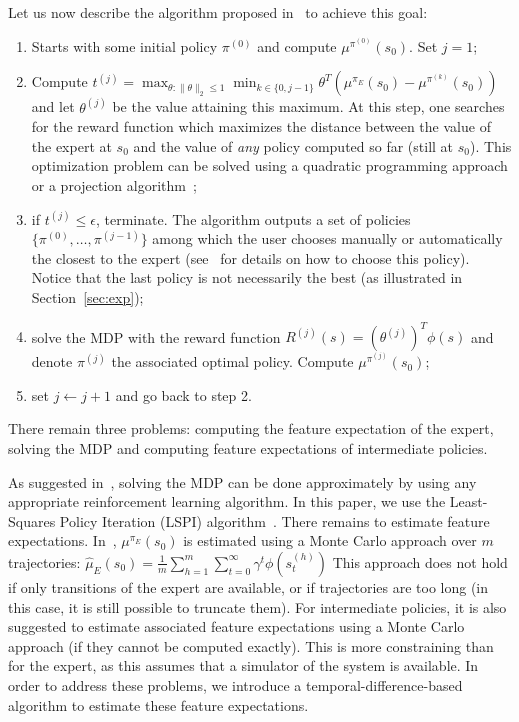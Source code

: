 \documentclass{llncs}
\begin{document}
Let us now describe the algorithm proposed in~\citep{abbeel2004apprenticeship} to
achieve this goal:
\begin{enumerate}
  \item Starts with some initial policy $\pi^{(0)}$ and compute
  $\mu^{\pi^{(0)}}(s_0)$. Set $j=1$;
  \item Compute $t^{(j)} = \max_{\theta: \|\theta\|_2\leq 1}
  \min_{k\in\{0,j-1\}}\theta^T(\mu^{\pi_E}(s_0) -
  \mu^{\pi^{(k)}}(s_0))$ and let $\theta^{(j)}$ be the value
  attaining this maximum. At this step, one searches for the reward
  function which maximizes the distance between the value of the
  expert at $s_0$ and the value of \emph{any} policy computed so far
  (still at $s_0$). This optimization problem can be solved using a
  quadratic programming approach or a projection
  algorithm~\citep{abbeel2004apprenticeship};
  \item if $t^{(j)}\leq \epsilon$, terminate. The algorithm outputs a
  set of policies $\{\pi^{(0)}, \dots, \pi^{(j-1)}\}$ among which
  the user chooses manually or automatically the closest to the
  expert (see~\citep{abbeel2004apprenticeship} for details on how to choose this
  policy).
  Notice that the last policy is not necessarily the best (as illustrated in Section~\ref{sec:exp});
  \item solve the MDP with the reward function $R^{(j)}(s) =
  (\theta^{(j)})^T\phi(s)$ and denote $\pi^{(j)}$ the associated
  optimal policy. Compute $\mu^{\pi^{(j)}}(s_0)$;
  \item set $j\leftarrow j+1$ and go back to step 2.
\end{enumerate}
There remain three problems: computing the feature expectation of
the expert, solving the MDP and computing feature expectations of
intermediate policies.

As suggested in~\citep{abbeel2004apprenticeship}, solving the MDP can be done
approximately by using any appropriate reinforcement learning
algorithm. In this paper, we use the Least-Squares Policy Iteration
(LSPI) algorithm~\citep{lagoudakis2003least}. There remains to estimate
feature expectations. In~\citep{abbeel2004apprenticeship}, $\mu^{\pi_E}(s_0)$ is
estimated using a Monte Carlo approach over $m$ trajectories:
$  \hat{\mu}_E(s_0) = \frac{1}{m} \sum\limits_{h=1}^m \sum\limits_{t=0}^\infty
  \gamma^t \phi(s_t^{(h)})$
This approach does not hold if only transitions of the expert are
available, or if trajectories are too long (in this case, it is
still possible to truncate them). For intermediate policies, it is
also suggested to estimate associated feature expectations using a
Monte Carlo approach (if they cannot be computed exactly). This is
more constraining than for the expert, as this assumes that a
simulator of the system is available. In order to address these
problems, we introduce a temporal-difference-based algorithm to
estimate these feature expectations.
\end{document}
